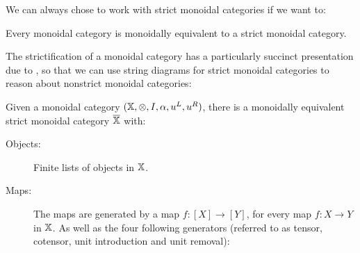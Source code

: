 

We can always chose to work with strict monoidal categories if we want to:

\begin{theorem}
Every monoidal category is monoidally equivalent to a strict monoidal category. 
\end{theorem}


The strictification of a monoidal category has a particularly succinct presentation due to \cite{wilson}, so that we can use string diagrams for strict monoidal categories to reason about nonstrict monoidal categories:
\begin{definition}
\label{def:proofnets}
Given a monoidal category $(\mathbb{X},\otimes,I,\alpha,u^L,u^R)$, there is a monoidally equivalent strict monoidal category $\overline{\mathbb{X}}\hspace*{.01cm}$ with:

\begin{description}
\item[Objects:] Finite lists of objects in $\mathbb{X}$.

\item[Maps:] The maps are generated by a map $f:[X]\to [Y]$, for every map $f:X\to Y$ in $\mathbb{X}$. As well as the four following generators (referred to as tensor, cotensor, unit introduction and unit removal):



\end{description}
\end{definition}
